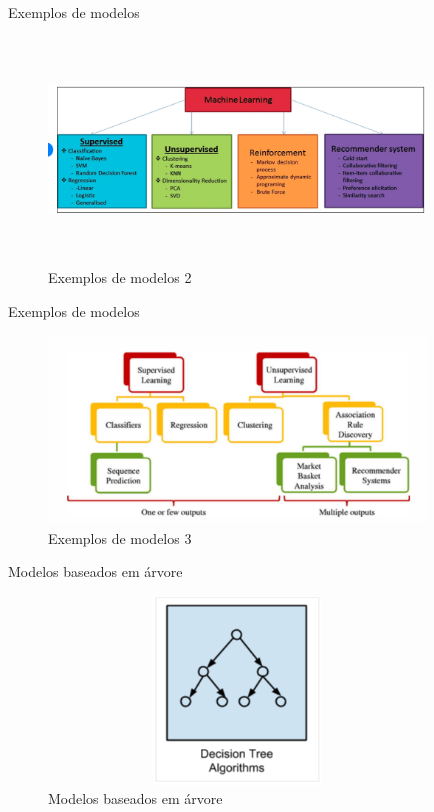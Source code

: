 \begin{frame}	
	\begin{block}{Exemplos de modelos}	
		\begin{figure}[!htb]
			\centering	  				
			\includegraphics[height=6cm, width = 10cm]{./pic/algoritmos2.png}
			\caption{Exemplos de modelos 2}
			\label{fig_modelos}
		\end{figure}
	\end{block}
\end{frame}

\begin{frame}	
	\begin{block}{Exemplos de modelos}	
		\begin{figure}[!htb]
			\centering	  				
			\includegraphics[height=5cm, width = 10cm]{./pic/algoritmos3.png}
			\caption{Exemplos de modelos 3}
			\label{fig_modelos}
		\end{figure}
	\end{block}
\end{frame}

\begin{frame}	
	\begin{block}{Modelos baseados em árvore}	
		\begin{figure}[!htb]
			\centering	  				
			\includegraphics[height=5cm, width = 10cm]{./pic/arvoreResumo.png}
			\caption{Modelos baseados em árvore}
			\label{fig_modelos}
		\end{figure}
	\end{block}
\end{frame}


